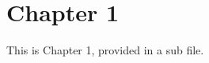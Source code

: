 \documentclass[main.tex]{subfiles}
\begin{document}
\section{Chapter 1}

This is Chapter 1, provided in a sub file. 
\end{document}
